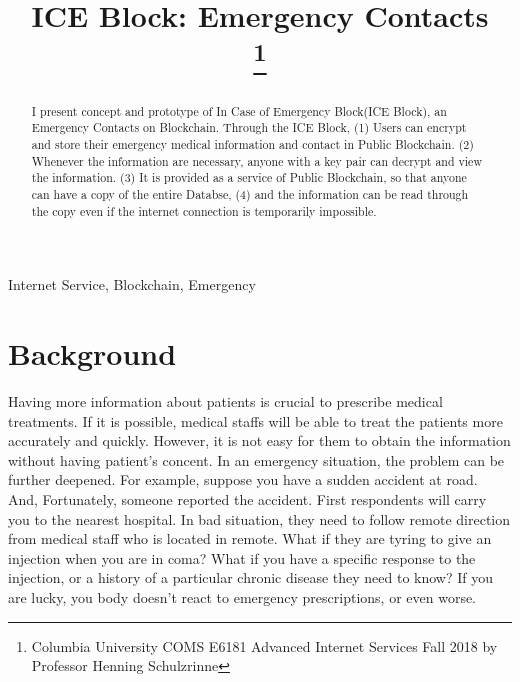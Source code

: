 \documentclass[conference]{IEEEtran}
\begin{document}
\title{ICE Block: Emergency Contacts\\
\thanks{Columbia University COMS E6181 Advanced Internet Services Fall 2018 by Professor Henning Schulzrinne}
}

\author{
}

\maketitle

\begin{abstract}
I present concept and prototype of In Case of Emergency Block(ICE Block),
an Emergency Contacts on Blockchain. Through the ICE Block,
(1) Users can encrypt and store their emergency medical information and contact in Public Blockchain.
(2) Whenever the information are necessary, anyone with a key pair can decrypt and view the information.
(3) It is provided as a service of Public Blockchain, so that anyone can have a copy of the entire Databse,
(4) and the information can be read through the copy even if the internet connection is temporarily impossible.
\end{abstract}


\begin{IEEEkeywords}
Internet Service, Blockchain, Emergency
\end{IEEEkeywords}

\section{Background}
Having more information about patients is crucial to prescribe medical treatments.
If it is possible, medical staffs will be able to treat the patients more accurately and quickly.
However, it is not easy for them to obtain the information without having patient's concent.
In an emergency situation, the problem can be further deepened.
For example, suppose you have a sudden accident at road.
And, Fortunately, someone reported the accident.
First respondents will carry you to the nearest hospital. In bad situation,
they need to follow remote direction from medical staff who is located in remote. What if they are tyring to give an injection when you are in coma?
What if you have a specific response to the injection, or a history of a particular chronic disease they need to know?
If you are lucky, you body doesn't react to emergency prescriptions, or even worse.
\end{document}
